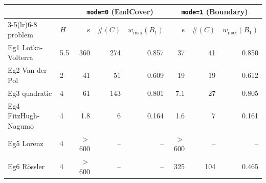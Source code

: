 \begin{tabular}{ll rrr rrr}
\toprule
& & \multicolumn{3}{c}{\texttt{mode=0} (EndCover)} & \multicolumn{3}{c}{\texttt{mode=1} (Boundary)} \\
\cmidrule(lr){3-5}\cmidrule(lr){6-8}
problem & $H$ & s & $\#(C)$ & $w_{\max}(B_1)$ & s & $\#(C)$ & $w_{\max}(B_1)$ \\
\midrule
Eg1 Lotka-Volterra & 5.5 & 360 & 274 & 0.857 & 37 & 41 & 0.850 \\
Eg2 Van der Pol & 2 & 41 & 51 & 0.609 & 19 & 19 & 0.612 \\
Eg3 quadratic & 4 & 61 & 143 & 0.801 & 7.1 & 27 & 0.805 \\
Eg4 FitzHugh-Nagumo & 4 & 1.8 & 6 & 0.164 & 1.6 & 7 & 0.161 \\
Eg5 Lorenz & 4 & $>$600 & -- & -- & $>$600 & -- & -- \\
Eg6 R\"ossler & 4 & $>$600 & -- & -- & 325 & 104 & 0.465 \\
\bottomrule
\end{tabular}
